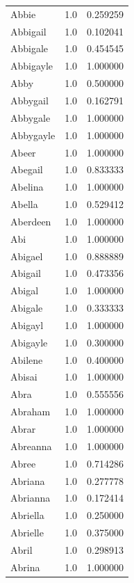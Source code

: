 \documentclass[
  letterpaper,
  DIV=11,
  numbers=noendperiod]{scrreprt}
\begin{document}
\begin{tabular}{lrr}
Abbie           &   1.0 &   0.259259 \\
Abbigail        &   1.0 &   0.102041 \\
Abbigale        &   1.0 &   0.454545 \\
Abbigayle       &   1.0 &   1.000000 \\
Abby            &   1.0 &   0.500000 \\
Abbygail        &   1.0 &   0.162791 \\
Abbygale        &   1.0 &   1.000000 \\
Abbygayle       &   1.0 &   1.000000 \\
Abeer           &   1.0 &   1.000000 \\
Abegail         &   1.0 &   0.833333 \\
Abelina         &   1.0 &   1.000000 \\
Abella          &   1.0 &   0.529412 \\
Aberdeen        &   1.0 &   1.000000 \\
Abi             &   1.0 &   1.000000 \\
Abigael         &   1.0 &   0.888889 \\
Abigail         &   1.0 &   0.473356 \\
Abigal          &   1.0 &   1.000000 \\
Abigale         &   1.0 &   0.333333 \\
Abigayl         &   1.0 &   1.000000 \\
Abigayle        &   1.0 &   0.300000 \\
Abilene         &   1.0 &   0.400000 \\
Abisai          &   1.0 &   1.000000 \\
Abra            &   1.0 &   0.555556 \\
Abraham         &   1.0 &   1.000000 \\
Abrar           &   1.0 &   1.000000 \\
Abreanna        &   1.0 &   1.000000 \\
Abree           &   1.0 &   0.714286 \\
Abriana         &   1.0 &   0.277778 \\
Abrianna        &   1.0 &   0.172414 \\
Abriella        &   1.0 &   0.250000 \\
Abrielle        &   1.0 &   0.375000 \\
Abril           &   1.0 &   0.298913 \\
Abrina          &   1.0 &   1.000000 \\

\end{tabular}
\end{document}
